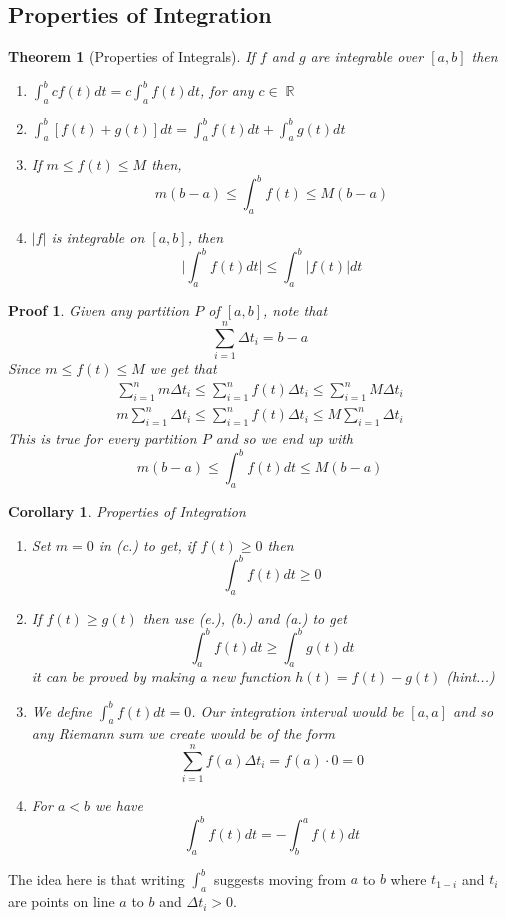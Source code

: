 \documentclass[10pt]{article}
\DeclareMathOperator{\R}{{\mathbb{R}}}
\theoremstyle{break}
\newtheorem{thm}{Theorem}[subsection]
\newtheorem{cor}{Corollary}[thm]
\newtheorem*{pf}{Proof}
\begin{document}
\subsection{Properties of Integration}
\begin{thm}[Properties of Integrals]
If $f$ and $g$ are integrable over $[a, b]$ then
\begin{enumerate}
    \item[a.] $\int^b_a cf(t) dt = c \int^b_af(t) dt$, for any $c \in \R$
    \item[b.] $\int^b_a[f(t) + g(t)] dt = \int^b_a f(t) dt + \int^b_a g(t) dt$
    \item[c.] If $m \le f(t) \le M$ then, $$m(b-a) \le \int^b_af(t) \le M(b-a)$$
    \item[d.] $|f|$ is integrable on $[a, b]$, then $$\Bigg|\int^b_a f(t) dt\Bigg| \le \int^b_a |f(t)| dt$$
\end{enumerate}
\end{thm}
\begin{pf}
Given any partition $P$ of $[a, b]$, note that $$\sum^n_{i=1}\Delta t_i = b-a$$
Since $m \le f(t) \le M$ we get that 
\begin{align*}
    \sum^n_{i=1}m \Delta t_i \le \sum^n_{i=1} f(t) \Delta t_i \le \sum^n_{i=1}M \Delta t_i\\
    m\sum^n_{i=1} \Delta t_i \le \sum^n_{i=1} f(t) \Delta t_i \le M\sum^n_{i=1} \Delta t_i
\end{align*}
This is true for every partition $P$ and so we end up with $$m(b-a) \le \int^b_a f(t) dt \le M(b-a)$$
\end{pf}
\begin{cor}
Properties of Integration
\begin{enumerate}
    \item[e.] Set $m=0$ in (c.) to get, if $f(t) \ge 0$ then $$\int^b_af(t) dt \ge 0$$
    \item[f.] If $f(t) \ge g(t)$ then use (e.), (b.) and (a.) to get $$\int^b_a f(t) dt \ge \int^b_a g(t) dt$$it can be proved by making a new function $h(t) = f(t) - g(t)$ (hint...)
    \item[g.] We define $\int^b_a f(t) dt = 0$. Our integration interval would be $[a, a]$ and so any Riemann sum we create would be of the form $$\sum^n_{i=1}f(a) \Delta t_i = f(a) \cdot 0 = 0$$
    \item[f.] For $a < b$ we have $$\int^b_a f(t) dt = - \int^a_b f(t) dt$$
\end{enumerate}
\end{cor}
The idea here is that writing $\int^b_a$ suggests moving from $a$ to $b$ where $t_{1-i}$ and $t_i$ are points on line $a$ to $b$ and $\Delta t_i > 0$.\\
\end{document}
